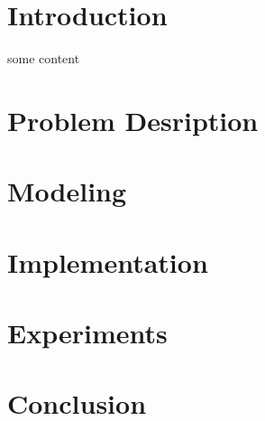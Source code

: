 \chapter{Introduction}
some content~\cite{CaEvac}

\chapter{Problem Desription}

\chapter{Modeling}

\chapter{Implementation}

\chapter{Experiments}

\chapter{Conclusion}
